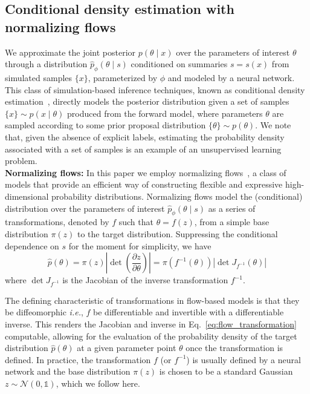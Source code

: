 \documentclass[prd,aps,10pt,nofootinbib,twocolumn,superscriptaddress,preprintnumbers,balancelastpage,longbibliography]{revtex4-1}
\begin{document}
\subsection{Conditional density estimation with normalizing flows}

We approximate the joint posterior $p(\theta\mid x)$ over the parameters of interest $\theta$ through a distribution $\hat p_\phi(\theta\mid s)$ conditioned on summaries $s=s(x)$ from simulated samples $\{x\}$, parameterized by $\phi$ and modeled by a neural network. This class of simulation-based inference techniques, known as conditional density estimation~\cite{papamakariosFastEpsilonFree2018,cranmer_kyle_2016_198541}, directly models the posterior distribution given a set of samples $\{x\}\sim p(x\mid\theta)$ produced from the forward model, where parameters $\theta$ are sampled according to some prior proposal distribution $\{\theta\}\sim p(\theta)$. We note that, given the absence of explicit labels, estimating the probability density associated with a set of samples is an example of an unsupervised learning problem. \\

\noindent
\textbf{Normalizing flows:}
In this paper we employ normalizing flows~\cite{papamakarios2019normalizing,rezende2015variational}, a class of models that provide an efficient way of constructing flexible and expressive high-dimensional probability distributions. Normalizing flows model the (conditional) distribution over the parameters of interest $\hat p_\phi(\theta\mid s)$ as a series of transformations, denoted by $f$ such that $\theta = f(z)$, from a simple base distribution $\pi({z})$ to the target distribution. Suppressing the conditional dependence on $s$ for the moment for simplicity, we have
\begin{equation}
    \label{eq:flow_transformation}
\hat{p}({\theta})=\pi(z)\left|\operatorname{det}\left(\frac{\partial z}{\partial {\theta}}\right)\right|=\pi(f^{-1}({\theta}))\left|\operatorname{det}J_{f^{-1}}(\theta)\right|
\end{equation}
where $\operatorname{det}J_{f^{-1}}$ is the Jacobian of the inverse transformation $f^{-1}$.

The defining characteristic of transformations in flow-based models is that they be diffeomorphic \emph{i.e.}, $f$ be differentiable and invertible with a differentiable inverse. This renders the Jacobian and inverse in Eq.~\eqref{eq:flow_transformation} computable, allowing for the evaluation of the probability density of the target distribution $\hat{p}({\theta})$ at a given parameter point $\theta$ once the transformation is defined. In practice, the transformation $f$ (or $f^{-1}$) is usually defined by a neural network and the base distribution $\pi(z)$ is chosen to be a standard Gaussian $z\sim \mathcal N(0, \mathbb{1})$, which we follow here. 
\end{document}
